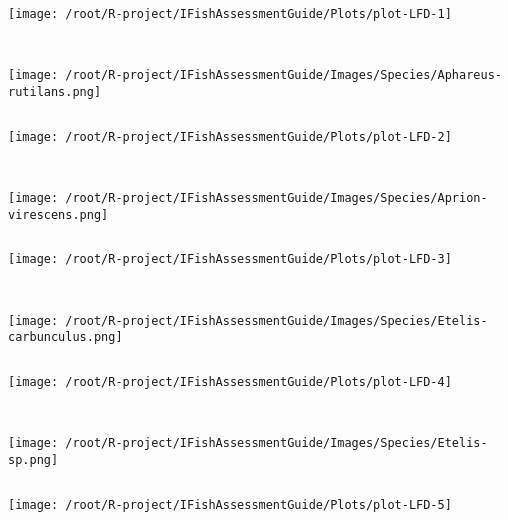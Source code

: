 \clearpage
\verbatimfont{\normalfont\rmfamily}
\begin{knitrout}
\color{fgcolor}
\texttt{[image: /root/R-project/IFishAssessmentGuide/Plots/plot-LFD-1]} 
\begin{kframe}\begin{verbatim}
 
\end{verbatim}
\end{kframe}
\texttt{[image: /root/R-project/IFishAssessmentGuide/Images/Species/Aphareus-rutilans.png]}
\begin{kframe}\begin{verbatim}
\end{verbatim}
\end{kframe}
\texttt{[image: /root/R-project/IFishAssessmentGuide/Plots/plot-LFD-2]} 
\begin{kframe}\begin{verbatim}
 
\end{verbatim}
\end{kframe}
\texttt{[image: /root/R-project/IFishAssessmentGuide/Images/Species/Aprion-virescens.png]}
\begin{kframe}\begin{verbatim}
\end{verbatim}
\end{kframe}
\texttt{[image: /root/R-project/IFishAssessmentGuide/Plots/plot-LFD-3]} 
\begin{kframe}\begin{verbatim}
 
\end{verbatim}
\end{kframe}
\texttt{[image: /root/R-project/IFishAssessmentGuide/Images/Species/Etelis-carbunculus.png]}
\begin{kframe}\begin{verbatim}
\end{verbatim}
\end{kframe}
\texttt{[image: /root/R-project/IFishAssessmentGuide/Plots/plot-LFD-4]} 
\begin{kframe}\begin{verbatim}
 
\end{verbatim}
\end{kframe}
\texttt{[image: /root/R-project/IFishAssessmentGuide/Images/Species/Etelis-sp.png]}
\begin{kframe}\begin{verbatim}
\end{verbatim}
\end{kframe}
\texttt{[image: /root/R-project/IFishAssessmentGuide/Plots/plot-LFD-5]} 
\begin{kframe}\begin{verbatim}
 

\end{verbatim}
\end{kframe}
\end{knitrout}
